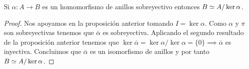 \begin{thm}
	Si $\alpha: A \to B$ es un homomorfismo de anillos sobreyectivo entonces $B \simeq A / \ker \alpha$.
\end{thm}

	\begin{figure}[h]
	\centering
\end{figure}

\begin{proof}
	Nos apoyamos en la proposición anterior tomando $I = \ker \alpha$. Como $\alpha$ y $\pi$ son sobreyectivas tenemos que $\overline{\alpha}$ es sobreyectiva. Aplicando el segundo resultado de la proposición anterior tenemos que $\ker \overline{\alpha} = \ker \alpha / \ker \alpha = \{ 0\} \implies \overline{\alpha}$ es inyectiva. Concluimos que $\overline{\alpha}$ es un isomorfismo de anillos y por tanto $B \simeq A / \ker \alpha$.
\end{proof}




